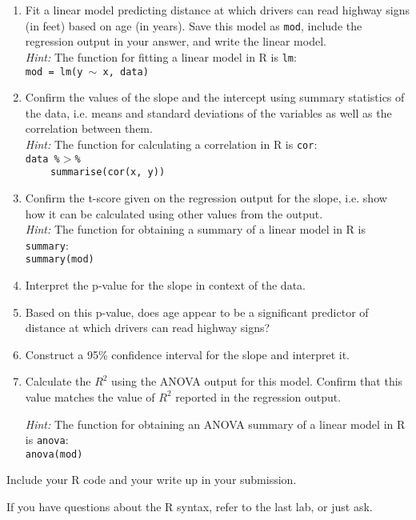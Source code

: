 \documentclass[11pt]{article}
\begin{document}
\begin{enumerate}
\item Fit a linear model predicting distance at which drivers can read highway signs (in feet) based on age (in years). Save this model as \texttt{mod}, include the regression output in your answer, and write the linear model. \\
\textit{Hint:} The function for fitting a linear model in R is \texttt{lm}: \\
\texttt{mod = lm(y $\sim$ x, data)}

\item Confirm the values of the slope and the intercept using summary statistics of the data, i.e. means and standard deviations of the variables as well as the correlation between them. \\
\textit{Hint:} The function for calculating a correlation in R is \texttt{cor}: \\
\texttt{data \%$>$\%} \\
$\:$$\qquad$\texttt{summarise(cor(x, y))}

\item Confirm the t-score given on the regression output for the slope, i.e. show how it can be calculated using other values from the output. \\
\textit{Hint:} The function for obtaining a summary of a linear model in R is \texttt{summary}: \\\texttt{summary(mod)}

\item Interpret the p-value for the slope in context of the data.

\item Based on this p-value, does age appear to be a significant predictor of distance at which drivers can read highway signs?

\item Construct a 95\% confidence interval for the slope and interpret it.

\item Calculate the $R^2$ using the ANOVA output for this model. Confirm that this value matches the value of $R^2$ reported in the regression output.

\textit{Hint:} The function for obtaining an ANOVA summary of a linear model in R is \texttt{anova}: \\\texttt{anova(mod)}
 \end{enumerate}
 
Include your R code and your write up in your submission. 

If you have questions about the R syntax, refer to the last lab, or just ask.
\end{document}
